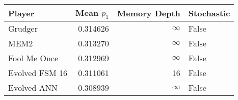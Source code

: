 \begin{tabular}{lrrl}
\toprule
         Player &  Mean $p_1$ &  Memory Depth & Stochastic \\
\midrule
        Grudger &    0.314626 &            \(\infty\) &      False \\
           MEM2 &    0.313270 &            \(\infty\) &      False \\
   Fool Me Once &    0.312969 &            \(\infty\) &      False \\
 Evolved FSM 16 &    0.311061 &            16 &      False \\
    Evolved ANN &    0.308939 &            \(\infty\) &      False \\
\bottomrule
\end{tabular}
